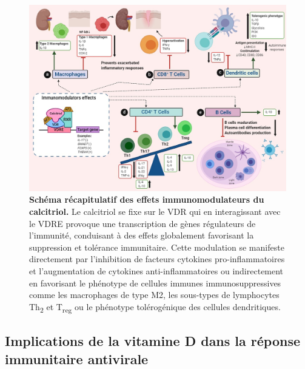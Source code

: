 \documentclass[
  a4paper,
  DIV=11,
  numbers=noendperiod,
  listof=totoc]{scrreprt}
\begin{document}
\begin{figure}

{\centering \includegraphics{figures/calcitriol-immunomodulatory.jpg}

}

\caption[\textbf{Schéma récapitulatif des effets immunomodulateurs du
calcitriol.}]{\label{fig-immunomod}\textbf{Schéma récapitulatif des
effets immunomodulateurs du calcitriol.} Le calcitriol se fixe sur le
VDR qui en interagissant avec le VDRE provoque une transcription de
gènes régulateurs de l'immunité, conduisant à des effets globalement
favorisant la suppression et tolérance immunitaire. Cette modulation se
manifeste directement par l'inhibition de facteurs cytokines
pro-inflammatoires et l'augmentation de cytokines anti-inflammatoires ou
indirectement en favorisant le phénotype de cellules immunes
immunosuppressives comme les macrophages de type M2, les sous-types de
lymphocytes Th\textsubscript{2} et T\textsubscript{reg} ou le phénotype
tolérogénique des cellules dendritiques. \textcite{Meza-Meza.2022}}

\end{figure}

\hypertarget{implications-de-la-vitamine-d-dans-la-ruxe9ponse-immunitaire-antivirale}{%
\subsection{Implications de la vitamine D dans la réponse immunitaire
antivirale}\label{implications-de-la-vitamine-d-dans-la-ruxe9ponse-immunitaire-antivirale}}
\end{document}
